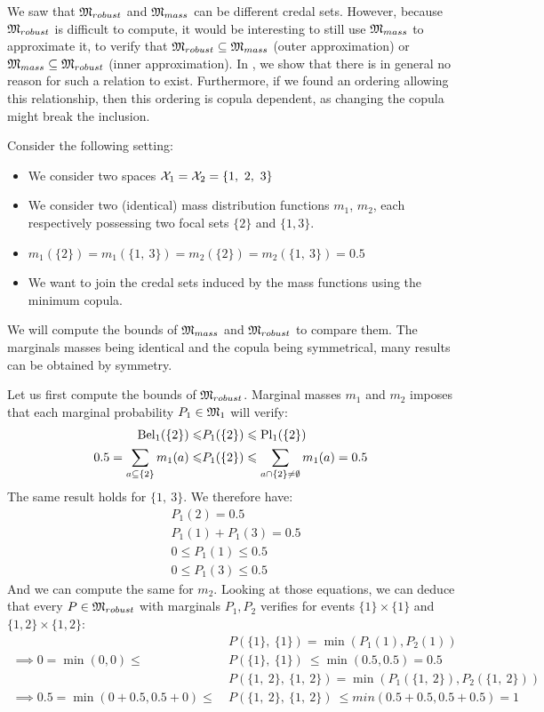 We saw that $\mathfrak{M}_{robust}$ and $\mathfrak{M}_{mass}$ can be different credal sets. However, because $\mathfrak{M}_{robust}$ is difficult to compute, it would be interesting to still use $\mathfrak{M}_{mass}$ to approximate it, \ie to verify that $\mathfrak{M}_{robust}\subseteq\mathfrak{M}_{mass}$ (outer approximation) or $\mathfrak{M}_{mass}\subseteq\mathfrak{M}_{robust}$ (inner approximation). In , we show that there is in general no reason for such a relation to exist. Furthermore, if we found an ordering allowing this relationship, then this ordering is copula dependent, as changing the copula might break the inclusion. 
\begin{example}\label{ex:mass_values}
    Consider the following setting:
    \begin{itemize}
        \item We consider two spaces $\mathcal{X}_1=\mathcal{X}_2=\{1,~2,~3\}$
        \item We consider two (identical) mass distribution functions $m_1$, $m_2$, each respectively possessing two focal sets $\{2\}$ and $\{1,3\}$.
        \item $m_1(\{2\}) = m_1(\{1,~3\}) = m_2(\{2\})= m_2(\{1,~3\}) = 0.5$
        \item We want to join the credal sets induced by the mass functions using the minimum copula.
    \end{itemize}
    We will compute the bounds of $\mathfrak{M}_{mass}$ and $\mathfrak{M}_{robust}$ to compare them. The marginals masses being identical and the copula being symmetrical, many results can be obtained by symmetry.
    
    Let us first compute the bounds of $\mathfrak{M}_{robust}$. Marginal masses $m_1$  and $m_2$ imposes that each marginal probability $P_1\in\mathfrak{M}_1$ will verify:
    \begin{align*}
        \mathrm{Bel}_1(\{2\}) \leqslant &P_1(\{2\}) \leqslant \mathrm{Pl}_1(\{2\})\\
        0.5 = \sum_{a\subseteq\{2\}}m_1(a) \leqslant &P_1(\{2\}) \leqslant \sum_{a\cap\{2\}\neq\emptyset}m_1(a) = 0.5
    \end{align*}
    The same result holds for $\{1,~3\}$. We therefore have:
    \begin{align*}
        &P_1(2)=0.5\\
        &P_1(1)+P_1(3)=0.5\\
        &0\leqslant P_1(1)\leqslant 0.5\\
        &0\leqslant P_1(3)\leqslant 0.5
    \end{align*}
    And we can compute the same for $m_2$. Looking at those equations, we can deduce that every $P\in\mathfrak{M}_{robust}$ with marginals $P_1,P_2$ verifies for events  $\{1\}\times\{1\}$ and $\{1,2\}\times\{1,2\}$:
    \begin{align*}
    	&P(\{1\},~ \{1\}) = \min(P_1(1), P_2(1))\\
        \implies 0 = \min(0, 0)  \leqslant ~&P(\{1\},~ \{1\}) ~\leqslant \min(0.5, 0.5) = 0.5\\
        &P(\{1, ~2\},~ \{1, ~2\}) = \min(P_1(\{1, ~2\}), P_2(\{1, ~2\}))\\
        \implies 0.5 = \min(0+0.5, 0.5+0) \leqslant ~&P(\{1, ~2\},~ \{1, ~2\}) ~\leqslant min(0.5+0.5, 0.5+0.5)=1
    \end{align*}
    

\end{example}
